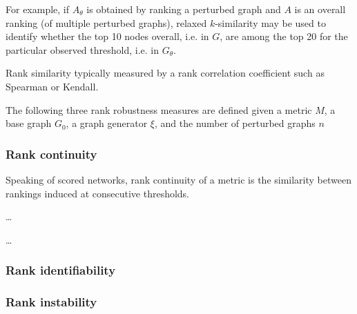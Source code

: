 For example, if $A_\theta$ is obtained by ranking a perturbed graph and $A$ is an overall ranking (of multiple perturbed graphs), relaxed $k$-similarity may be used to identify whether the top 10 nodes overall, i.e. in $G$, are among the top 20 for the particular observed threshold, i.e. in $G_\theta$.


 Rank similarity typically measured by a rank correlation coefficient such as Spearman or Kendall.

\parspace

The following three rank robustness measures are defined given a metric $M$, a base graph $G_0$, a graph generator $\xi$, and the number of perturbed graphs $n$

\subsubsection{Rank continuity}\label{sub:rank_continuity}

Speaking of scored networks, rank continuity of a metric is the similarity between rankings induced at consecutive thresholds.

\begin{definition}\label{def:rank_continuity}
    \ldots
\end{definition}

\ldots

\subsubsection{Rank identifiability}

\subsubsection{Rank instability}

